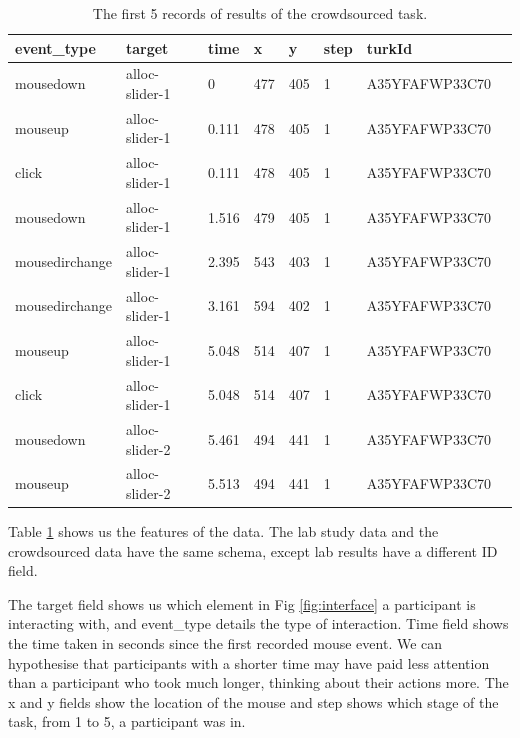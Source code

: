 \documentclass{article}
\begin{document}
\begin{table}[ht]
    \caption{\label{table:data} The first 5 records of results of the crowdsourced task.}

    \begin{tabular}{llllllll}
        \hline
        event\_type    & target         & time  & x   & y   & step & turkId         \\ \hline
        mousedown      & alloc-slider-1 & 0     & 477 & 405 & 1    & A35YFAFWP33C70 \\
        mouseup        & alloc-slider-1 & 0.111 & 478 & 405 & 1    & A35YFAFWP33C70 \\
        click          & alloc-slider-1 & 0.111 & 478 & 405 & 1    & A35YFAFWP33C70 \\
        mousedown      & alloc-slider-1 & 1.516 & 479 & 405 & 1    & A35YFAFWP33C70 \\
        mousedirchange & alloc-slider-1 & 2.395 & 543 & 403 & 1    & A35YFAFWP33C70 \\
        mousedirchange & alloc-slider-1 & 3.161 & 594 & 402 & 1    & A35YFAFWP33C70 \\
        mouseup        & alloc-slider-1 & 5.048 & 514 & 407 & 1    & A35YFAFWP33C70 \\
        click          & alloc-slider-1 & 5.048 & 514 & 407 & 1    & A35YFAFWP33C70 \\
        mousedown      & alloc-slider-2 & 5.461 & 494 & 441 & 1    & A35YFAFWP33C70 \\
        mouseup        & alloc-slider-2 & 5.513 & 494 & 441 & 1    & A35YFAFWP33C70 \\ \hline
    \end{tabular}
\end{table}

Table \ref{table:data} shows us the features of the data.
The lab study data and the crowdsourced data have the same schema, except lab results have a different ID field.

The target field shows us which element in Fig \ref{fig:interface} a participant is interacting with, and event\_type details the type of interaction.
Time field shows the time taken in seconds since the first recorded mouse event.
We can hypothesise that participants with a shorter time may have paid less attention than a participant who took much longer, thinking about their actions more.
The x and y fields show the location of the mouse and step shows which stage of the task, from 1 to 5, a participant was in.
\end{document}
